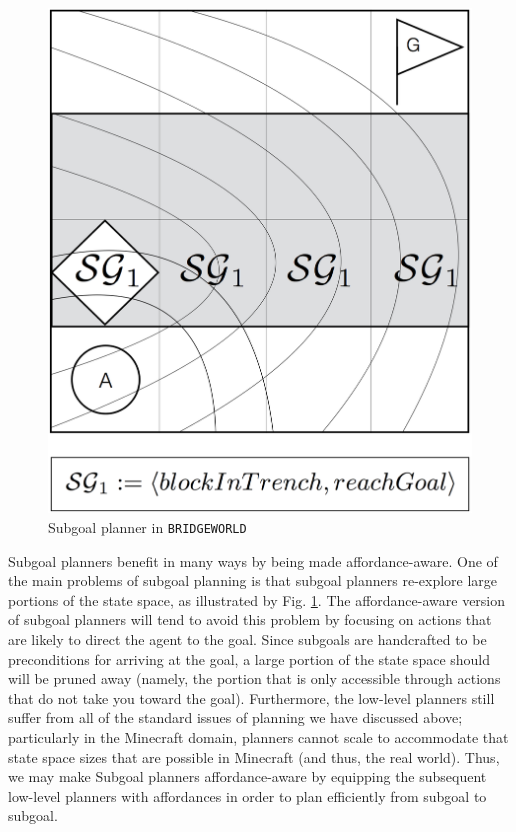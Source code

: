 \documentclass[]{article}
\begin{document}
\begin{figure}
\centering
\includegraphics[scale=0.22]{figures/bridgeworld_sg.png}
\caption{Subgoal planner in \texttt{BRIDGEWORLD}}
\label{fig:bwsg}
\end{figure}

Subgoal planners benefit in many ways by being made affordance-aware.
One of the main problems of subgoal planning is that subgoal planners
re-explore large portions of the state space, as illustrated by Fig. \ref{fig:bwsg}. The
affordance-aware version of subgoal planners will tend to avoid this problem by focusing
on actions that are likely to direct the agent to the goal. Since subgoals are handcrafted to be
preconditions for arriving at the goal, a large portion of the state space should will be pruned away
(namely, the portion that is only accessible through actions that do not take you toward the goal). 
Furthermore, the low-level planners still suffer from all of the standard issues of planning we have discussed above; 
particularly in the Minecraft domain, planners cannot scale to accommodate that
state space sizes that are possible in Minecraft (and thus, the real world). Thus, we may make Subgoal planners
affordance-aware by equipping the subsequent low-level planners with affordances in
order to plan efficiently from subgoal to subgoal.
\end{document}
